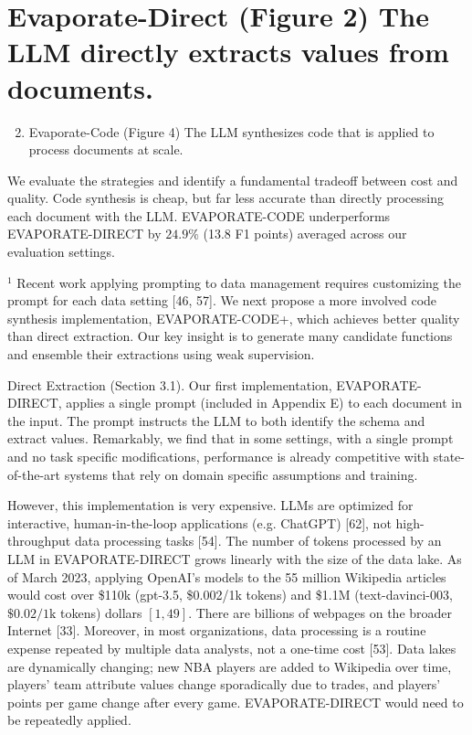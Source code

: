 \documentclass[10pt]{article}
\begin{document}
\section{Evaporate-Direct (Figure 2) The LLM directly extracts values from documents.}
\begin{enumerate}
  \setcounter{enumi}{1}
  \item Evaporate-Code (Figure 4) The LLM synthesizes code that is applied to process documents at scale.
\end{enumerate}

We evaluate the strategies and identify a fundamental tradeoff between cost and quality. Code synthesis is cheap, but far less accurate than directly processing each document with the LLM. EVAPORATE-CODE underperforms EVAPORATE-DIRECT by $24.9 \%$ (13.8 F1 points) averaged across our evaluation settings.

${ }^{1}$ Recent work applying prompting to data management requires customizing the prompt for each data setting [46, 57]. We next propose a more involved code synthesis implementation, EVAPORATE-CODE+, which achieves better quality than direct extraction. Our key insight is to generate many candidate functions and ensemble their extractions using weak supervision.

Direct Extraction (Section 3.1). Our first implementation, EVAPORATE-DIRECT, applies a single prompt (included in Appendix E) to each document in the input. The prompt instructs the LLM to both identify the schema and extract values. Remarkably, we find that in some settings, with a single prompt and no task specific modifications, performance is already competitive with state-of-the-art systems that rely on domain specific assumptions and training.

However, this implementation is very expensive. LLMs are optimized for interactive, human-in-the-loop applications (e.g. ChatGPT) [62], not high-throughput data processing tasks [54]. The number of tokens processed by an LLM in EVAPORATE-DIRECT grows linearly with the size of the data lake. As of March 2023, applying OpenAI's models to the 55 million Wikipedia articles would cost over \$110k (gpt-3.5, \$0.002/1k tokens) and \$1.1M (text-davinci-003, $\$ 0.02 / 1 \mathrm{k}$ tokens) dollars $[1,49]$. There are billions of webpages on the broader Internet [33]. Moreover, in most organizations, data processing is a routine expense repeated by multiple data analysts, not a one-time cost [53]. Data lakes are dynamically changing; new NBA players are added to Wikipedia over time, players' team attribute values change sporadically due to trades, and players' points per game change after every game. EVAPORATE-DIRECT would need to be repeatedly applied.
\end{document}
